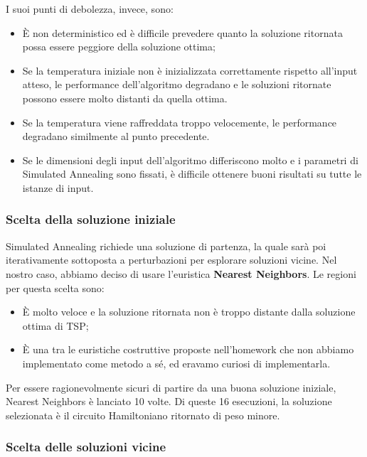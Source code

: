 \noindent I suoi punti di debolezza, invece, sono:

\begin{itemize}
    \item È non deterministico ed è difficile prevedere quanto la soluzione ritornata possa essere peggiore della soluzione ottima;
    \item Se la temperatura iniziale non è inizializzata correttamente rispetto all'input atteso, le performance dell'algoritmo degradano e le soluzioni ritornate possono essere molto distanti da quella ottima.
    \item Se la temperatura viene raffreddata troppo velocemente, le performance degradano similmente al punto precedente.
    \item Se le dimensioni degli input dell'algoritmo differiscono molto e i parametri di Simulated Annealing sono fissati, è difficile ottenere buoni risultati su tutte le istanze di input.
\end{itemize}

\subsubsection{Scelta della soluzione iniziale}

Simulated Annealing richiede una soluzione di partenza, la quale sarà poi iterativamente sottoposta a perturbazioni per esplorare soluzioni vicine. Nel nostro caso, abbiamo deciso di usare l'euristica \textbf{Nearest Neighbors}. Le regioni per questa scelta sono:

\begin{itemize}
    \item È molto veloce e la soluzione ritornata non è troppo distante dalla soluzione ottima di TSP;
    \item È una tra le euristiche costruttive proposte nell'homework che non abbiamo implementato come metodo a sé, ed eravamo curiosi di implementarla.
\end{itemize}

Per essere ragionevolmente sicuri di partire da una buona soluzione iniziale, Nearest Neighbors è lanciato 10 volte. Di queste 16 esecuzioni, la soluzione selezionata è il circuito Hamiltoniano ritornato di peso minore.

\subsubsection{Scelta delle soluzioni vicine}

